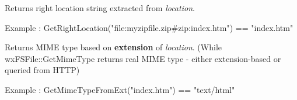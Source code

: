 
Returns right location string extracted from {\it location}. 

Example : GetRightLocation("file:myzipfile.zip\#zip:index.htm") == "index.htm"

\label{wxfilesystemhandlergetmimetypefromext}


Returns MIME type based on {\bf extension} of {\it location}. (While wxFSFile::GetMimeType
returns real MIME type - either extension-based or queried from HTTP)

Example : GetMimeTypeFromExt("index.htm") == "text/html"


